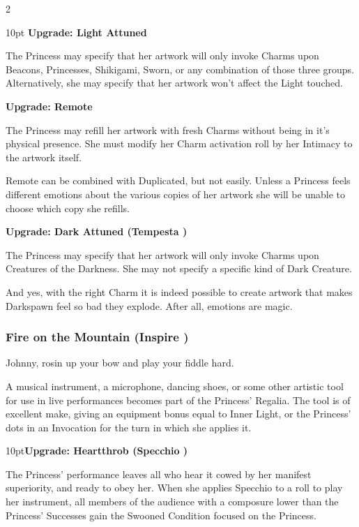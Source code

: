 \begin{multicols}{2}
\begin{myindentpar}{10pt}
\textbf{Upgrade: Light Attuned}

The Princess may specify that her artwork will only invoke Charms upon Beacons, Princesses, Shikigami, Sworn, or any combination of those three groups. Alternatively, she may specify that her artwork won't affect the Light touched. 

\textbf{Upgrade: Remote}

The Princess may refill her artwork with fresh Charms without being in it's physical presence. She must modify her Charm activation roll by her Intimacy to the artwork itself. 

Remote can be combined with Duplicated, but not easily. Unless a Princess feels different emotions about the various copies of her artwork she will be unable to choose which copy she refills.

\textbf{Upgrade: Dark Attuned (Tempesta \textbullet)}

The Princess may specify that her artwork will only invoke Charms upon Creatures of the Darkness. She may not specify a specific kind of Dark Creature. 

And yes, with the right Charm it is indeed possible to create artwork that makes Darkspawn feel so bad they explode. After all, emotions are magic. 
\end{myindentpar}


\subsubsection*{Fire on the Mountain (Inspire \textbullet)}

Johnny, rosin up your bow and play your fiddle hard.

A musical instrument, a microphone, dancing shoes, or some other artistic tool for use in live performances becomes part of the Princess' Regalia. The tool is of excellent make, giving an equipment bonus equal to Inner Light, or the Princess' dots in an Invocation for the turn in which she applies it. 

\begin{myindentpar}{10pt}\textbf{Upgrade: Heartthrob (Specchio \textbullet\textbullet)}

The Princess' performance leaves all who hear it cowed by her manifest superiority, and ready to obey her. When she applies Specchio to a roll to play her instrument, all members of the audience with a composure lower than the Princess' Successes gain the Swooned Condition focused on the Princess.\end{myindentpar}


\end{multicols}
